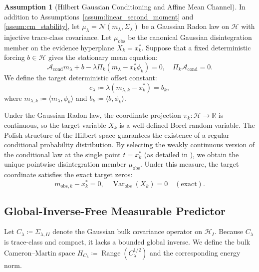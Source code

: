 \documentclass[11pt]{amsart}
\theoremstyle{plain}
\theoremstyle{definition}
\newtheorem{assumption}[theorem]{Assumption}
\theoremstyle{remark}
\newcommand{\cond}{\operatorname{cond}}
\newcommand{\Var}{\operatorname{Var}}
\begin{document}
    \begin{assumption}[Hilbert Gaussian Conditioning and Affine Mean Channel]
        \label{assum:gaussian_clamp}
        In addition to Assumptions~\ref{assum:linear_second_moment} and \ref{assum:cm_stability}, let $\mu_\lambda = \mathcal{N}(m_\lambda, \Sigma_\lambda)$ be a Gaussian Radon law on $\mathcal{H}$ with injective trace-class covariance. Let $\mu_{\mathrm{obs}}$ be the canonical Gaussian disintegration member on the evidence hyperplane $X_k = x_k^*$. Suppose that a fixed deterministic forcing $b \in \mathcal{H}$ gives the stationary mean equation:
        \begin{equation}
            \mathcal{A}_{\cond} m_\lambda + b - \lambda \Pi_k (m_\lambda - x_k^* \phi_k) = 0, \quad \Pi_k \mathcal{A}_{\cond} = 0.
        \end{equation}
        We define the target deterministic offset constant:
        \begin{equation}
            c_\lambda \coloneqq \lambda(m_{\lambda,k} - x_k^*) = b_k,
        \end{equation}
        where $m_{\lambda,k} \coloneqq \langle m_\lambda, \phi_k \rangle$ and $b_k \coloneqq \langle b, \phi_k \rangle$.
    \end{assumption}

    Under the Gaussian Radon law, the coordinate projection $\pi_k: \mathcal{H} \to \mathbb{R}$ is continuous, so the target variable $X_k$ is a well-defined Borel random variable. The Polish structure of the Hilbert space guarantees the existence of a regular conditional probability distribution. 
    By selecting the weakly continuous version of the conditional law at the single point $t = x_k^*$ (as detailed in ), we obtain the unique pointwise disintegration member $\mu_{\mathrm{obs}}$. Under this measure, the target coordinate satisfies the exact target zeros:
    \begin{equation}
        \label{eq:exact_target_zeros}
        m_{\text{obs},k} - x_k^* = 0, \quad \Var_{\text{obs}}(X_k) = 0 \quad (\text{exact}).
    \end{equation}

    \subsection{Global-Inverse-Free Measurable Predictor}
    \label{sec:gaussian:predictor}

    Let $C_\lambda \coloneqq \Sigma_{\lambda,II}$ denote the Gaussian bulk covariance operator on $\mathcal{H}_I$. Because $C_\lambda$ is trace-class and compact, it lacks a bounded global inverse. We define the bulk Cameron--Martin space $H_{C_\lambda} \coloneqq \operatorname{Range}(C_\lambda^{1/2})$ and the corresponding energy norm.
\end{document}
